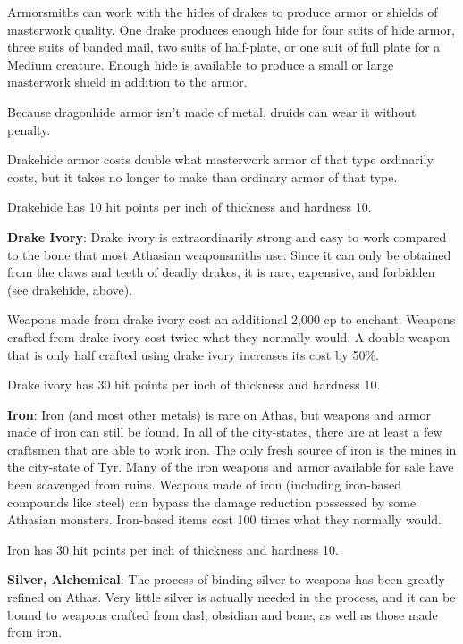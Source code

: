 Armorsmiths can work with the hides of drakes to produce armor or shields of masterwork quality. One drake produces enough hide for four suits of hide armor, three suits of banded mail, two suits of half-plate, or one suit of full plate for a Medium creature. Enough hide is available to produce a small or large masterwork shield in addition to the armor.

Because dragonhide armor isn't made of metal, druids can wear it without penalty.

Drakehide armor costs double what masterwork armor of that type ordinarily costs, but it takes no longer to make than ordinary armor of that type.

Drakehide has 10 hit points per inch of thickness and hardness 10.

\textbf{Drake Ivory}: Drake ivory is extraordinarily strong and easy to work compared to the bone that most Athasian weaponsmiths use. Since it can only be obtained from the claws and teeth of deadly drakes, it is rare, expensive, and forbidden (see drakehide, above).

Weapons made from drake ivory cost an additional 2,000 cp to enchant. Weapons crafted from drake ivory cost twice what they normally would. A double weapon that is only half crafted using drake ivory increases its cost by 50\%.

Drake ivory has 30 hit points per inch of thickness and hardness 10.


\textbf{Iron}: Iron (and most other metals) is rare on Athas, but weapons and armor made of iron can still be found. In all of the city-states, there are at least a few craftsmen that are able to work iron. The only fresh source of iron is the mines in the city-state of Tyr. Many of the iron weapons and armor available for sale have been scavenged from ruins. Weapons made of iron (including iron-based compounds like steel) can bypass the damage reduction possessed by some Athasian monsters. Iron-based items cost 100 times what they normally would.

Iron has 30 hit points per inch of thickness and hardness 10.

\textbf{Silver, Alchemical}: The process of binding silver to weapons has been greatly refined on Athas. Very little silver is actually needed in the process, and it can be bound to weapons crafted from dasl, obsidian and bone, as well as those made from iron.

